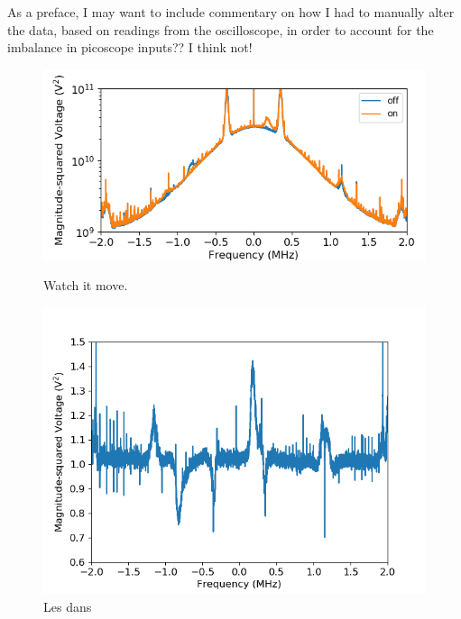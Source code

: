 \documentclass[12pt]{article}
\begin{document}
As a preface, I may want to include commentary on how I had to manually alter the data, based on readings from the oscilloscope, in order to account for the imbalance in picoscope inputs?? I think not!






\begin{figure}
\centering
\begin{minipage}{.5\textwidth}
	\centering
	\includegraphics[width=\linewidth]{up_on_off}
	\caption{Watch it move.}
	\label{fig:up_on_off}
\end{minipage}%
\begin{minipage}{.5\textwidth}
	\centering
	\includegraphics[width=\linewidth]{up_shape}
	\caption{Les dans}
	\label{fig:up_shape}
\end{minipage}
\end{figure}
\end{document}
